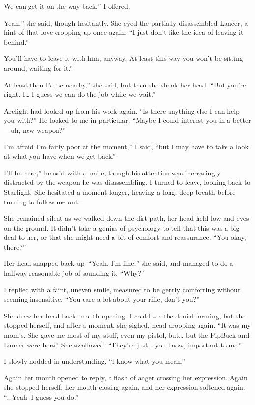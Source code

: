 \leavevmode{}We can get it on the way back,” I offered.

\leavevmode{}Yeah,” she said, though hesitantly. She eyed the partially disassembled Lancer, a hint of that love cropping up once again. “I just don’t like the idea of leaving it behind.”

\leavevmode{}You’ll have to leave it with him, anyway. At least this way you won’t be sitting around, waiting for it.”

\leavevmode{}At least then I’d be nearby,” she said, but then she shook her head. “But you’re right. I… I guess we can do the job while we wait.”

Arclight had looked up from his work again. “Is there anything else I can help you with?” He looked to me in particular. “Maybe I could interest you in a better—uh, new weapon?”

\leavevmode{}I’m afraid I’m fairly poor at the moment,” I said, “but I may have to take a look at what you have when we get back.”

\leavevmode{}I’ll be here,” he said with a smile, though his attention was increasingly distracted by the weapon he was disassembling. I turned to leave, looking back to Starlight. She hesitated a moment longer, heaving a long, deep breath before turning to follow me out.

She remained silent as we walked down the dirt path, her head held low and eyes on the ground. It didn’t take a genius of psychology to tell that this was a big deal to her, or that she might need a bit of comfort and reassurance. “You okay, there?”

Her head snapped back up. “Yeah, I’m fine,” she said, and managed to do a halfway reasonable job of sounding it. “Why?”

I replied with a faint, uneven smile, measured to be gently comforting without seeming insensitive. “You care a lot about your rifle, don’t you?”

She drew her head back, mouth opening. I could see the denial forming, but she stopped herself, and after a moment, she sighed, head drooping again. “It was my mom’s. She gave me most of my stuff, even my pistol, but… but the PipBuck and Lancer were hers.” She swallowed. “They’re just… you know, important to me.”

I slowly nodded in understanding. “I know what you mean.”

Again her mouth opened to reply, a flash of anger crossing her expression. Again she stopped herself, her mouth closing again, and her expression softened again. “...Yeah, I guess you do.”

